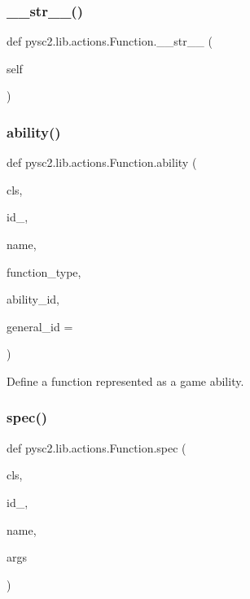 \subsubsection{\texorpdfstring{\+\_\+\+\_\+str\+\_\+\+\_\+()}{\_\_str\_\_()}}
{\footnotesize\ttfamily def pysc2.\+lib.\+actions.\+Function.\+\_\+\+\_\+str\+\_\+\+\_\+ (\begin{DoxyParamCaption}\item[{}]{self }\end{DoxyParamCaption})}

\mbox{\label{classpysc2_1_1lib_1_1actions_1_1_function_afa5332609b8f6e69057a0035add0a480}} 
\subsubsection{\texorpdfstring{ability()}{ability()}}
{\footnotesize\ttfamily def pysc2.\+lib.\+actions.\+Function.\+ability (\begin{DoxyParamCaption}\item[{}]{cls,  }\item[{}]{id\+\_\+,  }\item[{}]{name,  }\item[{}]{function\+\_\+type,  }\item[{}]{ability\+\_\+id,  }\item[{}]{general\+\_\+id = {} }\end{DoxyParamCaption})}

\begin{DoxyVerb}Define a function represented as a game ability.\end{DoxyVerb}
 \mbox{\label{classpysc2_1_1lib_1_1actions_1_1_function_a640d6d3480535d03e1b11cd4314ab221}} 
\subsubsection{\texorpdfstring{spec()}{spec()}}
{\footnotesize\ttfamily def pysc2.\+lib.\+actions.\+Function.\+spec (\begin{DoxyParamCaption}\item[{}]{cls,  }\item[{}]{id\+\_\+,  }\item[{}]{name,  }\item[{}]{args }\end{DoxyParamCaption})}

